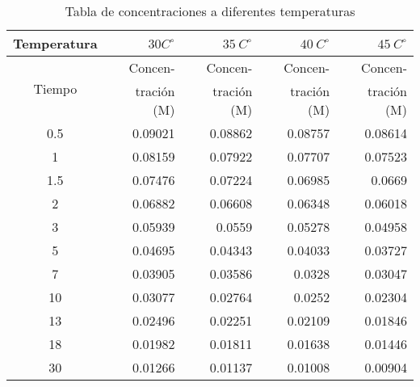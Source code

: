 \begin{table}[H]
    \centering
    \begin{tabular}{crrrr}
        \hline
        
        \multicolumn{1}{l}{Temperatura} & $30 C^{\circ} $   & $35 \: C^{\circ}$    & $40 \: C^{\circ}$    & $45 \: C^{\circ}$ \\ \hline
        \multicolumn{1}{c}{\multirow{2}[0]{*}{Tiempo}} & \multicolumn{1}{p{5.39em}}{Concen-} & \multicolumn{1}{p{5.39em}}{Concen-} & \multicolumn{1}{p{5.39em}}{Concen-} & \multicolumn{1}{p{5.39em}}{Concen-} \\ 
              & \multicolumn{1}{p{5.39em}}{tración (M)} & \multicolumn{1}{p{5.39em}}{tración (M)} & \multicolumn{1}{p{5.39em}}{tración (M)} & \multicolumn{1}{p{5.39em}}{tración (M)} \\ \hline
        0.5   & 0.09021 & 0.08862 & 0.08757 & 0.08614 \\
        1     & 0.08159 & 0.07922 & 0.07707 & 0.07523 \\
        1.5   & 0.07476 & 0.07224 & 0.06985 & 0.0669  \\
        2     & 0.06882 & 0.06608 & 0.06348 & 0.06018 \\
        3     & 0.05939 & 0.0559  & 0.05278 & 0.04958 \\
        5     & 0.04695 & 0.04343 & 0.04033 & 0.03727 \\
        7     & 0.03905 & 0.03586 & 0.0328  & 0.03047 \\
        10    & 0.03077 & 0.02764 & 0.0252  & 0.02304 \\
        13    & 0.02496 & 0.02251 & 0.02109 & 0.01846 \\
        18    & 0.01982 & 0.01811 & 0.01638 & 0.01446 \\
        30    & 0.01266 & 0.01137 & 0.01008 & 0.00904 \\ 
        
        \hline
    \end{tabular}
    \caption{Tabla de concentraciones a diferentes temperaturas}
    \label{tab:concentracion}
\end{table}
  